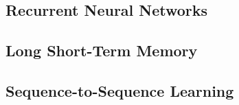\subsection{Recurrent Neural Networks}\label{RNN}

\subsection{Long Short-Term Memory}\label{LSTM}

\subsection{Sequence-to-Sequence Learning}\label{S2S}